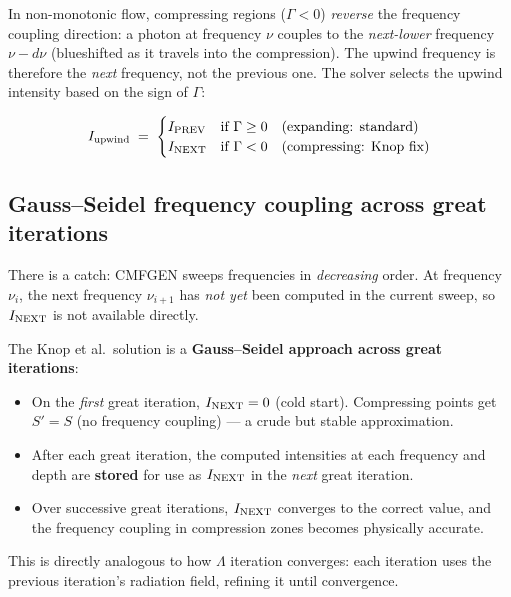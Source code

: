 \documentclass[11pt]{article}
\begin{document}
In non-monotonic flow, compressing regions ($\Gamma < 0$) \emph{reverse}
the frequency coupling direction: a photon at frequency $\nu$ couples to
the \emph{next-lower} frequency $\nu - d\nu$ (blueshifted as it travels
into the compression).  The upwind frequency is therefore the
\emph{next} frequency, not the previous one.  The solver selects the
upwind intensity based on the sign of $\Gamma$:

\begin{equation}
  I_{\rm upwind} \;=\;
  \begin{cases}
    I_{\rm PREV} & \text{if } \Gamma \ge 0 \quad\text{(expanding: standard)} \\
    I_{\rm NEXT} & \text{if } \Gamma < 0 \quad\text{(compressing: Knop fix)}
  \end{cases}
\end{equation}

\subsection{Gauss--Seidel frequency coupling across great iterations}

There is a catch: CMFGEN sweeps frequencies in \emph{decreasing} order.
At frequency $\nu_i$, the next frequency $\nu_{i+1}$ has \emph{not yet}
been computed in the current sweep, so $I_{\rm NEXT}$ is not available
directly.

The Knop et al.\ solution is a \textbf{Gauss--Seidel approach across
great iterations}:

\begin{itemize}[nosep]
  \item On the \emph{first} great iteration, $I_{\rm NEXT} = 0$ (cold
        start).  Compressing points get $S' = S$ (no frequency
        coupling) --- a crude but stable approximation.
  \item After each great iteration, the computed intensities at each
        frequency and depth are \textbf{stored} for use as
        $I_{\rm NEXT}$ in the \emph{next} great iteration.
  \item Over successive great iterations, $I_{\rm NEXT}$ converges to
        the correct value, and the frequency coupling in compression
        zones becomes physically accurate.
\end{itemize}

This is directly analogous to how $\Lambda$ iteration converges: each
iteration uses the previous iteration's radiation field, refining it
until convergence.
\end{document}
